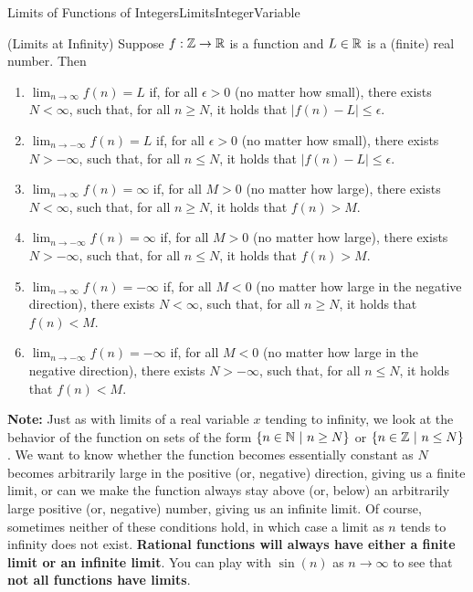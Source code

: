 \begin{factColor}{Limits of Functions of Integers}{LimitsIntegerVariable} %

\begin{definition}
\label{def:LimitAtInfinityRationalFunctionOfInteger}
(Limits at Infinity) Suppose $f:\mathbb Z\to \mathbb R$ is a function and $L\in \mathbb R$ is a (finite) real number. Then 
\begin{enumerate}
\renewcommand{\labelenumi}{(\alph{enumi})}
\setlength{\itemsep}{.2cm}
    \item $\displaystyle{\lim_{n \to \infty}} f(n) = L$ if, for all $\epsilon >0$ (no matter how small), there exists $N < \infty$, such that, for all $n \ge N$, it holds that $|f(n) - L| \le \epsilon$. 
    \item $\displaystyle{\lim_{n \to -\infty}} f(n) = L$ if, for all $\epsilon >0$ (no matter how small), there exists $N > -\infty$, such that, for all $n \le N$, it holds that $|f(n) - L| \le \epsilon$. 
    \item $\displaystyle{\lim_{n \to \infty}} f(n) = \infty$ if, for all $M>0$ (no matter how large), there exists $N < \infty$, such that, for all $n \ge N$, it holds that $f(n) > M$. 
    \item $\displaystyle{\lim_{n \to -\infty}} f(n) = \infty$ if, for all $M>0$ (no matter how large), there exists $N > -\infty$, such that, for all $n \le N$, it holds that $f(n) >M$. 
    \item $\displaystyle{\lim_{n \to \infty}} f(n) = -\infty$ if, for all $M< 0$ (no matter how large in the negative direction), there exists $N < \infty$, such that, for all $n \ge N$, it holds that $f(n) < M$. 
    \item $\displaystyle{\lim_{n \to -\infty}} f(n) = -\infty$ if, for all $M< 0$ (no matter how large in the negative direction), there exists $N > -\infty$, such that, for all $n \le N$, it holds that $f(n) < M$. 
\end{enumerate}

\textbf{Note:} Just as with limits of a real variable $x$ tending to infinity, we look at the behavior of the function on sets of the form $\{ n \in \mathbb N~|~ n \ge N\}$ or $\{ n \in \mathbb Z~|~ n \le N\}$. We want to know whether the function becomes essentially constant as $N$ becomes arbitrarily large in the positive (or, negative) direction, giving us a finite limit, or can we make the function always stay above (or, below) an arbitrarily large positive (or, negative) number, giving us an infinite limit. Of course, sometimes neither of these conditions hold, in which case a limit as $n$ tends to infinity does not exist. \textbf{Rational functions will always have either a finite limit or an infinite limit}. You can play with $\sin(n)$ as $n \to \infty$ to see that \textbf{not all functions have limits}.  
\end{definition}
    
\end{factColor}

